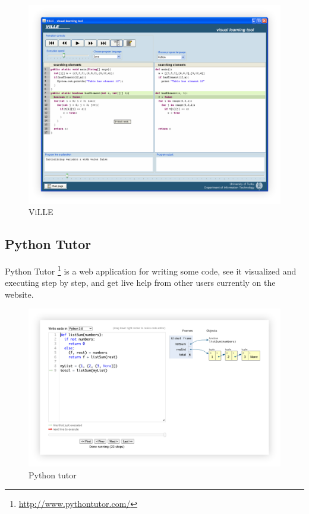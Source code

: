 \documentclass[]{usiinfbachelorproject}
\begin{document}
\begin{figure}[h!]
\centering
\includegraphics[scale=0.2]{figures/ville.png}
\caption {ViLLE}
\end{figure}

\subsection{Python Tutor}

Python Tutor \footnote{\url{http://www.pythontutor.com/}} is a web application for writing some code, see it visualized and executing step by step, and get live help from other users currently on the website.

\begin{figure}[h!]
\centering
\includegraphics[scale=0.177]{figures/python_tutor}
\caption {Python tutor}
\end{figure}
\end{document}
